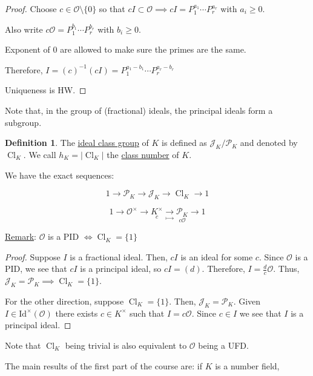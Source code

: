 \documentclass[openany]{amsbook}
\numberwithin{section}{chapter}
\theoremstyle{definition}
\newtheorem*{definition}{Definition}
\newcommand{\Cl}{\operatorname{Cl}}
\begin{document}
\begin{proof}
    Choose \(c \in \mathcal{O} \setminus \{ 0 \} \) so that \(cI \subset \mathcal{O} \implies cI = P_1^{a_1}\cdots P_r^{a_r}\) with \(a_i \geq 0\).

    Also write \(c \mathcal{O} = P_1^{b_1}\cdots P_r^{b_r}\) with \(b_i \geq 0\).

    Exponent of \(0\) are allowed to make sure the primes are the same.

    Therefore, \(I = (c)^{-1} (cI) = P_1^{a_1 - b_1} \cdots P_r^{a_r - b_r}\) 

    Uniqueness is HW.

\end{proof}

Note that, in the group of (fractional) ideals, the principal ideals form a subgroup.

\begin{definition}
    The \underline{ideal class group} of \(K\) is defined as \(\mathcal{J}_K / \mathcal{P}_K\) and denoted by \(\Cl_K\). We call \(h_K = \vert \Cl_K \vert \) the \underline{class number} of \(K\).
\end{definition}

We have the exact sequences:

\[
    1 \to \mathcal{P}_K \to \mathcal{J}_K \to \Cl_K \to 1
\]

\[
    1 \to \mathcal{O} ^\times \to \underset{c}{K^\times} \underset{\mapsto}{\to} \underset{c \mathcal{O}}{\mathcal{P}_K} \to 1
\]

\underline{Remark}: \(\mathcal{O}\) is a PID \(\iff \Cl_K = \{ 1 \}\)

\begin{proof}
    Suppose \(I\) is a fractional ideal. Then, \(cI\) is an ideal for some \(c\). Since \(\mathcal{O}\) is a PID, we see that \(cI\) is a principal ideal, so \(cI = (d)\). Therefore, \(I = \frac{d}{c} \mathcal{O}\). Thus, \(\mathcal{J}_K = \mathcal{P}_K \implies \Cl_K = \{ 1 \}\).

    For the other direction, suppose \(\Cl_K = \{ 1 \}\). Then, \(\mathcal{J}_K = \mathcal{P}_K\). Given \(I \in \operatorname{Id^\times }(\mathcal{O})\) there exists \(c\in K^\times\) such that \(I = c \mathcal{O}\). Since \(c\in I\) we see that \(I\) is a principal ideal. 
\end{proof}

Note that \(\Cl_K\) being trivial is also equivalent to \(\mathcal{O}\) being a UFD.

The main results of the first part of the course are: if \(K\) is a number field,
\end{document}
